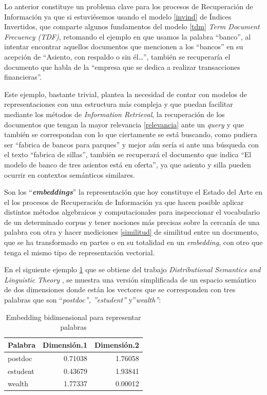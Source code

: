 \documentclass[
  12pt,
  openany]{book}
\begin{document}
\hfill\break
Lo anterior constituye un problema clave para los procesos de Recuperación de Información ya que si estuviésemos usando el modelo \ref{invind} de Índices Invertidos, que comparte algunos fundamentos del modelo \ref{tdm} \emph{Term Document Frecuency (TDF)}, retomando el ejemplo en que usamos la palabra ``banco'', al intentar encontrar aquellos documentos que mencionen a los ``bancos'' en su acepción de ``Asiento, con respaldo o sin él\ldots{}'', también se recuperaría el documento que habla de la ``empresa que se dedica a realizar transacciones financieras''.

Este ejemplo, bastante trivial, plantea la necesidad de contar con modelos de representaciones con una estructura más compleja y que puedan facilitar mediante los métodos de \emph{Information Retrieval}, la recuperación de los documentos que tengan la mayor relevancia \ref{relevancia} ante un \emph{query} y que también se correspondan con lo que ciertamente se está buscando, como pudiera ser ``fabrica de bancos para parques'' y mejor aún sería si ante una búsqueda con el texto ``fabrica de sillas'', también se recuperará el documento que indica ``El modelo de banco de tres asientos está en oferta'', ya que asiento y silla pueden ocurrir en contextos semánticos similares.

Son los ``\textbf{\emph{embeddings}}'' la representación que hoy constituye el Estado del Arte en el los procesos de Recuperación de Información ya que hacen posible aplicar distintos métodos algebraicos y computacionales para inspeccionar el vocabulario de un determinado corpus y tener nociones más precisas sobre la cercanía de una palabra con otra y hacer mediciones \ref{similitud} de similitud entre un documento, que se ha transformado en partes o en su totalidad en un \emph{embedding}, con otro que tenga el mismo tipo de representación vectorial.~

En el siguiente ejemplo \ref{tab:tblembedding} que se obtiene del trabajo \emph{Distributional Semantics and Linguistic Theory} \citep{boleda2020}, se muestra una versión simplificada de un espacio semántico de dos dimensiones donde están los vectores que se corresponden con tres palabras que son ``\emph{postdoc'', ''estudent''} y''\emph{wealth''}:

\begin{table}

\caption{\label{tab:tblembedding}Embedding bidimensional para representar palabras}
\centering
\begin{tabular}[t]{lrr}
\toprule
Palabra & Dimensión.1 & Dimensión.2\\
\midrule
postdoc & 0.71038 & 1.76058\\
estudent & 0.43679 & 1.93841\\
wealth & 1.77337 & 0.00012\\
\bottomrule
\end{tabular}
\end{table}
\end{document}
